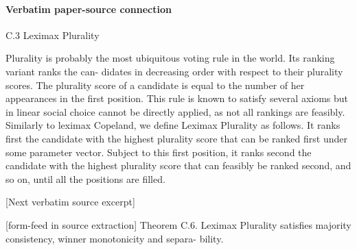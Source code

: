 \documentclass[10pt]{article}
\begin{document}
\paragraph{Verbatim paper-source connection}
\begin{ReviewVerbatim}
C.3   Leximax Plurality

Plurality is probably the most ubiquitous voting rule in the world. Its ranking variant ranks the can-
didates in decreasing order with respect to their plurality scores. The plurality score of a candidate
is equal to the number of her appearances in the first position. This rule is known to satisfy several
axioms but in linear social choice cannot be directly applied, as not all rankings are feasibly.
Similarly to leximax Copeland, we define Leximax Plurality as follows. It ranks first the candidate
with the highest plurality score that can be ranked first under some parameter vector. Subject to
this first position, it ranks second the candidate with the highest plurality score that can feasibly be
ranked second, and so on, until all the positions are filled.

[Next verbatim source excerpt]


[form-feed in source extraction]
Theorem C.6. Leximax Plurality satisfies majority consistency, winner monotonicity and separa-
bility.


\end{ReviewVerbatim}
\end{document}
